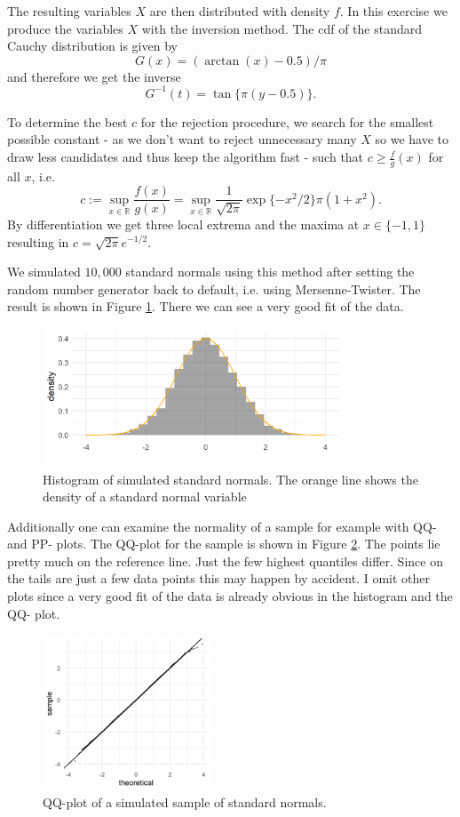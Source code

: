 The resulting variables $X$ are then distributed with density $f$. In this exercise we produce the variables $X$ with the inversion method. The cdf of the standard Cauchy distribution is given by $$G(x)= (\arctan (x) - 0.5)/\pi$$ and therefore we get the inverse $$G^{-1}(t)=\tan \{\pi (y-0.5)\}.$$

To determine the best $c$ for the rejection procedure, we search for the smallest possible constant - as we don't want to reject unnecessary many $X$ so we have to draw less candidates and thus keep the algorithm fast - such that $c\geq \frac{f}{g}(x)$ for all $x$, i.e. $$c:= \sup_{x\in \mathbb{R}} \frac{f(x)}{g(x)}= \sup_{x\in \mathbb{R}} \frac{1}{\sqrt{2\pi}}\exp\{-x^2/2\} \pi (1+x^2).$$ By differentiation we get three local extrema and the maxima at $x\in \{-1,1\}$ resulting in $c=\sqrt{2\pi}e^{-1/2}$.

We simulated $10,000$ standard normals using this method after setting the random number generator back to default, i.e. using Mersenne-Twister. The result is shown in Figure \ref{2normhist}. There we can see a very good fit of the data.
\begin{figure}[!th]
\centering
\includegraphics[width=0.8\textwidth, keepaspectratio]{ex2/normal_hist.png}
\caption{Histogram of simulated standard normals. The orange line shows the density of a standard normal variable}
\label{2normhist}
\end{figure}

Additionally one can examine the normality of a sample for example with QQ- and PP- plots. The QQ-plot for the sample is shown in Figure \ref{2normqq}. The points lie pretty much on the reference line. Just the few highest quantiles differ. Since on the tails are just a few data points this may happen by accident. I omit other plots since a very good fit of the data is already obvious in the histogram and the QQ- plot. 
\begin{figure}[bh]
\centering
\includegraphics[width=0.45\textwidth, keepaspectratio]{ex2/normal_qq.png}
\caption{QQ-plot of a simulated sample of standard normals.}
\label{2normqq}
\end{figure}

